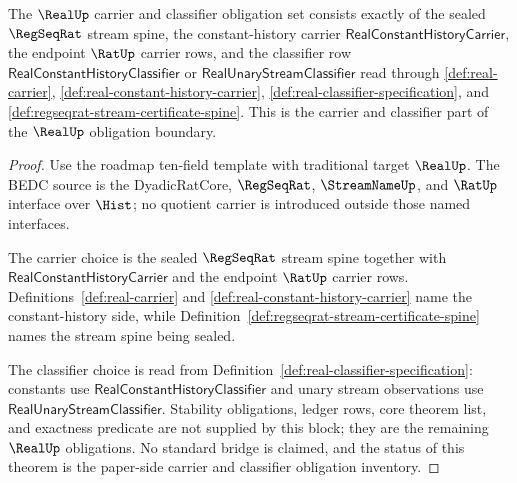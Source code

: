 \begin{theorem}
\label{thm:realup-obligation-carrier-classifier}
The $\RealUp$ carrier and classifier obligation set consists exactly of the
sealed $\RegSeqRat$ stream spine, the constant-history carrier
$\mathsf{RealConstantHistoryCarrier}$, the endpoint $\RatUp$ carrier rows, and
the classifier row
$\mathsf{RealConstantHistoryClassifier}$ or
$\mathsf{RealUnaryStreamClassifier}$ read through
\autoref{def:real-carrier},
\autoref{def:real-constant-history-carrier},
\autoref{def:real-classifier-specification}, and
\autoref{def:regseqrat-stream-certificate-spine}. This is the carrier and
classifier part of the $\RealUp$ obligation boundary.
\end{theorem}
\begin{proof}
Use the roadmap ten-field template with traditional target $\RealUp$. The
BEDC source is the DyadicRatCore, $\RegSeqRat$, $\StreamNameUp$, and $\RatUp$
interface over $\Hist$; no quotient carrier is introduced outside those
named interfaces.

The carrier choice is the sealed $\RegSeqRat$ stream spine together with
$\mathsf{RealConstantHistoryCarrier}$ and the endpoint $\RatUp$ carrier rows.
Definitions~\ref{def:real-carrier} and
\ref{def:real-constant-history-carrier} name the constant-history side, while
Definition~\ref{def:regseqrat-stream-certificate-spine} names the stream
spine being sealed.

The classifier choice is read from
Definition~\ref{def:real-classifier-specification}: constants use
$\mathsf{RealConstantHistoryClassifier}$ and unary stream observations use
$\mathsf{RealUnaryStreamClassifier}$. Stability obligations, ledger rows,
core theorem list, and exactness predicate are not supplied by this block;
they are the remaining $\RealUp$ obligations. No standard bridge is claimed,
and the status of this theorem is the paper-side carrier and classifier
obligation inventory.
\end{proof}


